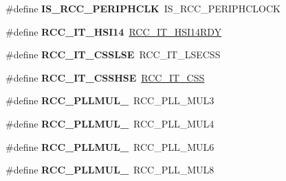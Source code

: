\begin{DoxyCompactItemize}
\item 
\mbox{\label{group___h_a_l___r_c_c___aliased_gad38e6304f89528092a9a24943b955d03}} 
\#define {\bfseries I\+S\+\_\+\+R\+C\+C\+\_\+\+P\+E\+R\+I\+P\+H\+C\+LK}~I\+S\+\_\+\+R\+C\+C\+\_\+\+P\+E\+R\+I\+P\+H\+C\+L\+O\+CK
\item 
\mbox{\label{group___h_a_l___r_c_c___aliased_ga1d2b2eb3fca0475683b879377c952fbf}} 
\#define {\bfseries R\+C\+C\+\_\+\+I\+T\+\_\+\+H\+S\+I14}~\hyperlink{group___r_c_c___interrupt_ga3b85dd0ddf5c816fad2bb2c149129c01}{R\+C\+C\+\_\+\+I\+T\+\_\+\+H\+S\+I14\+R\+DY}
\item 
\mbox{\label{group___h_a_l___r_c_c___aliased_ga2693825b3d6ae5e2202c59e9ff0f84e9}} 
\#define {\bfseries R\+C\+C\+\_\+\+I\+T\+\_\+\+C\+S\+S\+L\+SE}~R\+C\+C\+\_\+\+I\+T\+\_\+\+L\+S\+E\+C\+SS
\item 
\mbox{\label{group___h_a_l___r_c_c___aliased_ga0f173b0e032747b82a9322739f6e3635}} 
\#define {\bfseries R\+C\+C\+\_\+\+I\+T\+\_\+\+C\+S\+S\+H\+SE}~\hyperlink{group___r_c_c___interrupt_ga9bb34a4912d2084dc1c0834eb53aa7a3}{R\+C\+C\+\_\+\+I\+T\+\_\+\+C\+SS}
\item 
\mbox{\label{group___h_a_l___r_c_c___aliased_ga7ff52ba9f89830affd1e02929b4db74e}} 
\#define {\bfseries R\+C\+C\+\_\+\+P\+L\+L\+M\+U\+L\+\_}~R\+C\+C\+\_\+\+P\+L\+L\+\_\+\+M\+U\+L3
\item 
\mbox{\label{group___h_a_l___r_c_c___aliased_ga48cf05c73391e2319b0be6b2a3c9d9c9}} 
\#define {\bfseries R\+C\+C\+\_\+\+P\+L\+L\+M\+U\+L\+\_}~R\+C\+C\+\_\+\+P\+L\+L\+\_\+\+M\+U\+L4
\item 
\mbox{\label{group___h_a_l___r_c_c___aliased_gacbc14a066a66d57867c5f1f5a3669201}} 
\#define {\bfseries R\+C\+C\+\_\+\+P\+L\+L\+M\+U\+L\+\_}~R\+C\+C\+\_\+\+P\+L\+L\+\_\+\+M\+U\+L6
\item 
\mbox{\label{group___h_a_l___r_c_c___aliased_gaa2dc44220ad0fa4e951fa2bd64b3b154}} 
\#define {\bfseries R\+C\+C\+\_\+\+P\+L\+L\+M\+U\+L\+\_}~R\+C\+C\+\_\+\+P\+L\+L\+\_\+\+M\+U\+L8

\end{DoxyCompactItemize}
